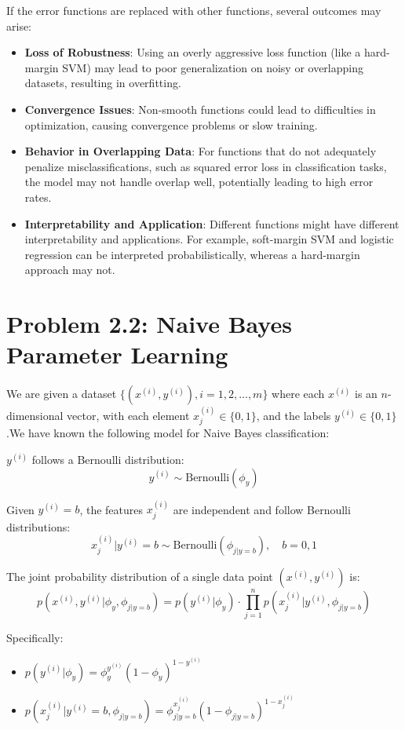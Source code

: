 \documentclass[12pt]{article}
\begin{document}
If the error functions are replaced with other functions, several outcomes may arise:

\begin{itemize}
    \item \textbf{Loss of Robustness}: Using an overly aggressive loss function (like a hard-margin SVM) may lead to poor generalization on noisy or overlapping datasets, resulting in overfitting.
    \item \textbf{Convergence Issues}: Non-smooth functions could lead to difficulties in optimization, causing convergence problems or slow training.
    \item \textbf{Behavior in Overlapping Data}: For functions that do not adequately penalize misclassifications, such as squared error loss in classification tasks, the model may not handle overlap well, potentially leading to high error rates.
    \item \textbf{Interpretability and Application}: Different functions might have different interpretability and applications. For example, soft-margin SVM and logistic regression can be interpreted probabilistically, whereas a hard-margin approach may not.
\end{itemize}

\newpage

\section*{Problem 2.2: Naive Bayes Parameter Learning}

We are given a dataset \(\{(x^{(i)}, y^{(i)}), i = 1, 2, \dots, m\}\) where each \(x^{(i)}\) is an \(n\)-dimensional vector, with each element \(x_j^{(i)} \in \{0, 1\}\), and the labels \(y^{(i)} \in \{0, 1\}\).We have known the following model for Naive Bayes classification:

\(y^{(i)}\) follows a Bernoulli distribution:
\[
    y^{(i)} \sim \text{Bernoulli}(\phi_y)
\]

Given \(y^{(i)} = b\), the features \(x_j^{(i)}\) are independent and follow Bernoulli distributions:
\[
    x_j^{(i)} | y^{(i)} = b \sim \text{Bernoulli}(\phi_{j|y=b}), \quad b = 0, 1
\]

The joint probability distribution of a single data point \((x^{(i)}, y^{(i)})\) is:
\[
  p(x^{(i)}, y^{(i)} | \phi_y, \phi_{j|y=b}) = p(y^{(i)} | \phi_y) \cdot \prod_{j=1}^n p(x_j^{(i)} | y^{(i)}, \phi_{j|y=b})
\]

Specifically:
  
\begin{itemize}
    \item \(p(y^{(i)} | \phi_y) = \phi_y^{y^{(i)}} (1 - \phi_y)^{1 - y^{(i)}}\)
    \item \(p(x_j^{(i)} | y^{(i)} = b, \phi_{j|y=b}) = \phi_{j|y=b}^{x_j^{(i)}} (1 - \phi_{j|y=b})^{1 - x_j^{(i)}}\)
\end{itemize}
\end{document}

